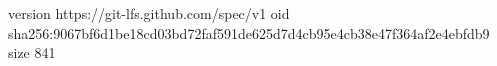 version https://git-lfs.github.com/spec/v1
oid sha256:9067bf6d1be18cd03bd72faf591de625d7d4cb95e4cb38e47f364af2e4ebfdb9
size 841
